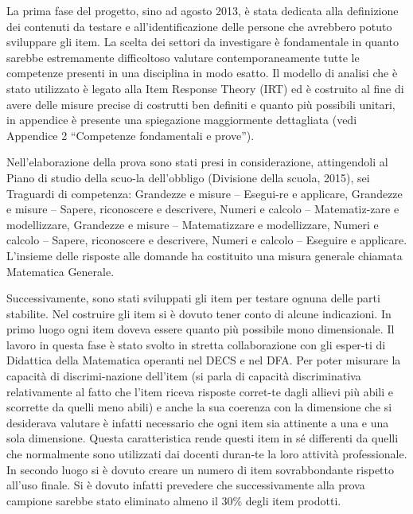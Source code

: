 \documentclass[
]{book}
\begin{document}
La prima fase del progetto, sino ad agosto 2013, è stata dedicata alla definizione dei contenuti da testare e all'identificazione delle persone che avrebbero potuto sviluppare gli item.
La scelta dei settori da investigare è fondamentale in quanto sarebbe estremamente difficoltoso valutare contemporaneamente tutte le competenze presenti in una disciplina in modo esatto. Il modello di analisi che è stato utilizzato è legato alla Item Response Theory (IRT) ed è costruito al fine di avere delle misure precise di costrutti ben definiti e quanto più possibili unitari, in appendice è presente una spiegazione maggiormente dettagliata (vedi Appendice 2 ``Competenze fondamentali e prove'').

Nell'elaborazione della prova sono stati presi in considerazione, attingendoli al Piano di studio della scuo-la dell'obbligo (Divisione della scuola, 2015), sei Traguardi di competenza: Grandezze e misure -- Esegui-re e applicare, Grandezze e misure -- Sapere, riconoscere e descrivere, Numeri e calcolo -- Matematiz-zare e modellizzare, Grandezze e misure -- Matematizzare e modellizzare, Numeri e calcolo -- Sapere, riconoscere e descrivere, Numeri e calcolo -- Eseguire e applicare. L'insieme delle risposte alle domande ha costituito una misura generale chiamata Matematica Generale.

Successivamente, sono stati sviluppati gli item per testare ognuna delle parti stabilite. Nel costruire gli item si è dovuto tener conto di alcune indicazioni. In primo luogo ogni item doveva essere quanto più possibile mono dimensionale. Il lavoro in questa fase è stato svolto in stretta collaborazione con gli esper-ti di Didattica della Matematica operanti nel DECS e nel DFA. Per poter misurare la capacità di discrimi-nazione dell'item (si parla di capacità discriminativa relativamente al fatto che l'item riceva risposte corret-te dagli allievi più abili e scorrette da quelli meno abili) e anche la sua coerenza con la dimensione che si desiderava valutare è infatti necessario che ogni item sia attinente a una e una sola dimensione. Questa caratteristica rende questi item in sé differenti da quelli che normalmente sono utilizzati dai docenti duran-te la loro attività professionale. In secondo luogo si è dovuto creare un numero di item sovrabbondante rispetto all'uso finale. Si è dovuto infatti prevedere che successivamente alla prova campione sarebbe stato eliminato almeno il 30\% degli item prodotti.
\end{document}
